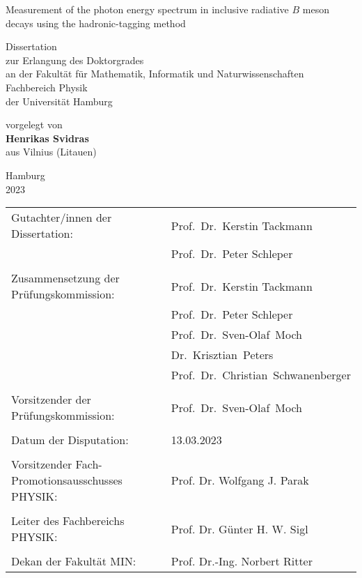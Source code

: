 \thispagestyle{empty}
\begin{center}
\huge{Measurement of the photon energy spectrum in inclusive radiative $B$ meson
decays using the hadronic-tagging method}

\vspace{0.2\textheight}
\large{Dissertation \\ zur Erlangung des Doktorgrades \\ an der Fakult\"at f\"ur Mathematik, Informatik und Naturwissenschaften \\ Fachbereich Physik \\ der Universit\"at Hamburg}

\vspace{0.2\textheight}
\large{vorgelegt von \\ \textbf{Henrikas Svidras} \\ aus Vilnius (Litauen)}

\vspace{0.1\textheight}
\large{Hamburg \\ 2023}
\end{center}

\newpage
\thispagestyle{empty}

\newpage
\thispagestyle{empty}

\vspace*{\fill}

\begin{tabular*}{\textwidth}{l @{\extracolsep{\fill}} l}
Gutachter/innen der Dissertation: & Prof.~Dr.~Kerstin Tackmann  \\
& Prof.~Dr.~Peter Schleper \\
\\
Zusammensetzung der Prüfungskommission: & Prof.~Dr.~Kerstin Tackmann\\
& Prof.~Dr.~Peter Schleper\\
& Prof.~Dr.~Sven-Olaf~Moch \\
& Dr.~Krisztian~Peters  \\
& Prof.~Dr.~Christian~Schwanenberger \\
\\
Vorsitzender der Prüfungskommission: & Prof.~Dr.~Sven-Olaf~Moch \\
\\
Datum der Disputation: & 13.03.2023 \\ %
\\
Vorsitzender Fach-Promotionsausschusses PHYSIK: &  Prof. Dr. Wolfgang J. Parak \\
\\
Leiter des Fachbereichs PHYSIK: & Prof. Dr. G\"unter H. W. Sigl \\
\\
Dekan der Fakultät MIN: & Prof. Dr.-Ing. Norbert Ritter \\
\end{tabular*}

\newpage
\thispagestyle{empty}
